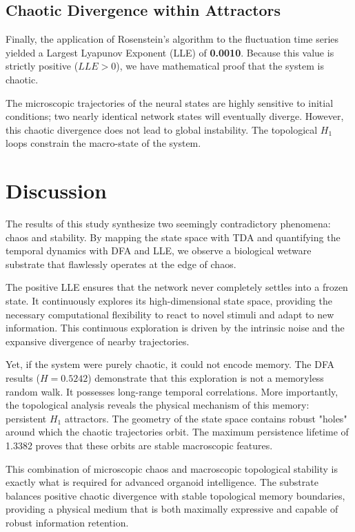 \documentclass[11pt,a4paper]{article}
\begin{document}
\subsection{Chaotic Divergence within Attractors}
Finally, the application of Rosenstein's algorithm to the fluctuation time series yielded a Largest Lyapunov Exponent (LLE) of \textbf{0.0010}. Because this value is strictly positive ($LLE > 0$), we have mathematical proof that the system is chaotic. 

The microscopic trajectories of the neural states are highly sensitive to initial conditions; two nearly identical network states will eventually diverge. However, this chaotic divergence does not lead to global instability. The topological $H_1$ loops constrain the macro-state of the system. 

\section{Discussion}

The results of this study synthesize two seemingly contradictory phenomena: chaos and stability. By mapping the state space with TDA and quantifying the temporal dynamics with DFA and LLE, we observe a biological wetware substrate that flawlessly operates at the edge of chaos. 

The positive LLE ensures that the network never completely settles into a frozen state. It continuously explores its high-dimensional state space, providing the necessary computational flexibility to react to novel stimuli and adapt to new information. This continuous exploration is driven by the intrinsic noise and the expansive divergence of nearby trajectories. 

Yet, if the system were purely chaotic, it could not encode memory. The DFA results ($H=0.5242$) demonstrate that this exploration is not a memoryless random walk. It possesses long-range temporal correlations. More importantly, the topological analysis reveals the physical mechanism of this memory: persistent $H_1$ attractors. The geometry of the state space contains robust "holes" around which the chaotic trajectories orbit. The maximum persistence lifetime of 1.3382 proves that these orbits are stable macroscopic features.

This combination of microscopic chaos and macroscopic topological stability is exactly what is required for advanced organoid intelligence. The substrate balances positive chaotic divergence with stable topological memory boundaries, providing a physical medium that is both maximally expressive and capable of robust information retention. 
\end{document}
